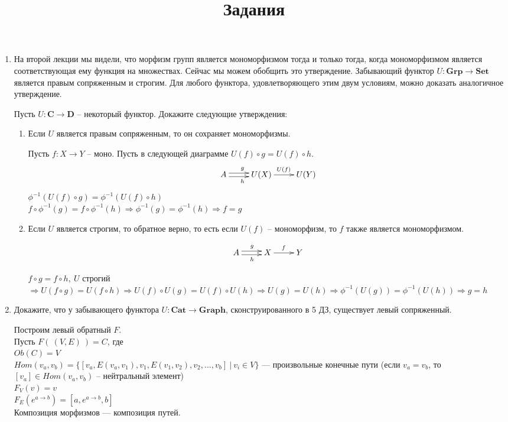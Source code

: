 \documentclass[draft]{article}
\newcommand{\cat}[1]{\mathbf{#1}}
\renewcommand{\C}{\cat{C}}
\newcommand{\D}{\cat{D}}
\newcommand{\Set}{\cat{Set}}
\newcommand{\Grp}{\cat{Grp}}
\begin{document}
\title{Задания}
\maketitle

\begin{enumerate}

\item На второй лекции мы видели, что морфизм групп является мономорфизмом тогда и только тогда, когда мономорфизмом является соответствующая ему функция на множествах.
Сейчас мы можем обобщить это утверждение.
Забывающий функтор $U : \Grp \to \Set$ является правым сопряженным и строгим.
Для любого функтора, удовлетворяющего этим двум условиям, можно доказать аналогичное утверждение.

Пусть $U : \C \to \D$ -- некоторый функтор.
Докажите следующие утверждения:
\begin{enumerate}
\item Если $U$ является правым сопряженным, то он сохраняет мономорфизмы.

Пусть $f : X \to Y$ -- моно. Пусть в следующей диаграмме $U(f) \circ g = U(f) \circ h$. 
\[
\xymatrix{
A \ar@<+0.5ex>[r]^{g} \ar@<-0.5ex>[r]_{h} & U(X) \ar[r]^{U(f)} & U(Y)
}
\]
$\phi^{-1}(U(f) \circ g) = \phi^{-1}(U(f) \circ h)$\\
$f \circ \phi^{-1}(g) = f \circ \phi^{-1}(h) \Rightarrow \phi^{-1}(g) = \phi^{-1}(h) \Rightarrow f = g$

\item Если $U$ является строгим, то обратное верно, то есть если $U(f)$ -- мономорфизм, то $f$ также является мономорфизмом.

\[
\xymatrix{
A \ar@<+0.5ex>[r]^{g} \ar@<-0.5ex>[r]_{h} & X \ar[r]^{f} & Y
}
\]

$f \circ g = f \circ h, ~U $ строгий  $ \Rightarrow U(f \circ g) = U(f \circ h) \Rightarrow U(f) \circ U(g) = U(f) \circ U(h) \Rightarrow U(g) = U(h) \Rightarrow \phi^{-1}(U(g)) = \phi^{-1}(U(h)) \Rightarrow g = h$

\end{enumerate}

\item Докажите, что у забывающего функтора $U : \cat{Cat} \to \cat{Graph}$, сконструированного в 5 ДЗ, существует левый сопряженный.

Построим левый обратный $F$.\\
Пусть $F(~(V, E)~) = C$, где \\
$Ob(C) = V$\\
$Hom(v_a, v_b) = \{[v_a, E(v_a, v_1), v_1, E(v_1, v_2), v_2, ..., v_b] ~|~ v_i \in V\}$ --- произвольные конечные пути
(если $v_a = v_b$, то $[v_a] \in Hom(v_a, v_b)$ -- нейтральный элемент) \\
$F_V(v) = v$\\
$F_E(e^{a\to b}) = [a, e^{a\to b}, b]$\\
Композиция морфизмов --- композиция путей.


\end{enumerate}
\end{document}
